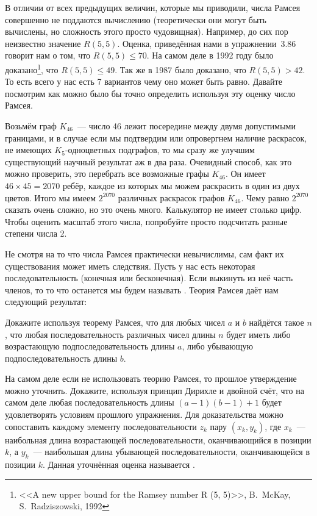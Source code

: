 В отличии от всех предыдущих величин, которые мы приводили, числа Рамсея совершенно не поддаются вычислению (теоретически они могут быть вычислены, но сложность этого просто чудовищная). Например, до сих пор неизвестно значение $R(5, 5)$. Оценка, приведённая нами в упражнении~3.86 говорит нам о том, что $R(5, 5)\le70$. На самом деле в 1992 году было доказано\footnote{<<A new upper bound for the Ramsey number R (5, 5)>>, B.~McKay, S.~Radziszowski, 1992}, что $R(5, 5)\le 49$. Так же в 1987 было доказано, что $R(5, 5) > 42$. То есть всего у нас есть 7 вариантов чему оно может быть равно. Давайте посмотрим как можно было бы точно определить используя эту оценку число Рамсея.

Возьмём граф $K_{46}$~--- число 46 лежит посередине между двумя допустимыми границами, и в случае если мы подтвердим или опровергнем наличие раскрасок, не имеющих $K_5$-одноцветных подграфов, то мы сразу же улучшим существующий научный результат аж в два раза. Очевидный способ, как это можно проверить, это перебрать все возможные графы $K_{46}$. Он имеет $46\times45 = 2070$ ребёр, каждое из которых мы можем раскрасить в один из двух цветов. Итого мы имеем $2^{2070}$ различных раскрасок графов $K_{46}$. Чему равно $2^{2070}$ сказать очень сложно, но это очень много. Калькулятор не имеет столько цифр. Чтобы оценить масштаб этого числа, попробуйте просто подсчитать разные степени числа 2.

Не смотря на то что числа Рамсея практически невычислимы, сам факт их существования может иметь следствия. Пусть у нас есть некоторая последовательность (конечная или бесконечная). Если выкинуть из неё часть членов, то то что останется мы будем называть . Теория Рамсея даёт нам следующий результат:

\begin{exercise}
Докажите используя теорему Рамсея, что для любых чисел $a$ и $b$ найдётся такое $n$, что любая последовательность различных чисел длины $n$ будет иметь либо возрастающую подпоследовательность длины $a$, либо убывающую подпоследовательность длины $b$.
\end{exercise}

\begin{exercise}
На самом деле если не использовать теорию Рамсея, то прошлое утверждение можно уточнить. Докажите, используя принцип Дирихле и двойной счёт, что на самом деле любая последовательность длины $(a-1)(b-1)+1$ будет удовлетворять условиям прошлого упражнения. Для доказательства можно сопоставить каждому элементу последовательности $z_k$ пару $(x_k, y_k)$, где $x_k$~--- наибольная длина возрастающей последовательности, оканчивающийся в позиции $k$, а $y_k$~--- наибольшая длина убывающей последовательности, оканчивающейся в позиции $k$. Данная уточнённая оценка называется .
\end{exercise}

